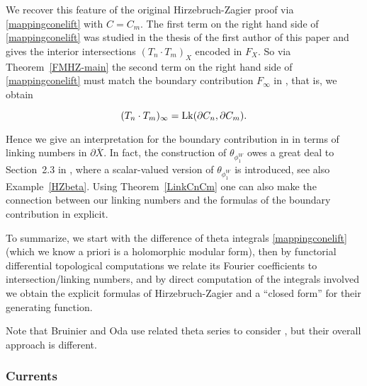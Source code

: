 We recover this feature of the original Hirzebruch-Zagier proof via \eqref{mappingconelift} with $C=C_m$. The first term on the right hand side of \eqref{mappingconelift} was studied in the thesis of the first author of this paper \cite{FCompo} and gives the interior intersections $(T_n \cdot T_m)_X$ encoded in $F_X$. So via Theorem~\ref{FMHZ-main} the second term on the right hand side of \eqref{mappingconelift} must match the boundary contribution $F_{\infty}$ in \cite{HZ}, that is, we obtain
\begin{theorem}
\[
({T}_n \cdot {T}_m)_{\infty} = \operatorname{Lk}( \partial C_n, \partial C_m).
\]
\end{theorem}
Hence we give an interpretation for the boundary contribution in \cite{HZ} in terms of linking numbers in $\partial \overline{X}$. In fact, the construction of $\theta_{\phi_1^W}$ owes a great deal to Section~2.3 in \cite{HZ}, where a scalar-valued version of $\theta_{\phi_1^W}$ is introduced, see also Example~\ref{HZbeta}. Using Theorem~\ref{LinkCnCm} one can also make the connection between our linking numbers and the formulas of the boundary contribution in \cite{HZ} explicit. 

To summarize, we start with the difference of theta integrals \eqref{mappingconelift} (which we know a priori is a holomorphic modular form), then by functorial differential topological computations we relate its Fourier coefficients to intersection/linking numbers, and by direct computation of the integrals involved we obtain the explicit formulas of Hirzebruch-Zagier and a ``closed form'' for their generating function.

Note that Bruinier \cite{B-123} and Oda \cite{Oda} use related theta series to consider \cite{HZ}, but their overall approach is different. 


\subsubsection*{Currents}

